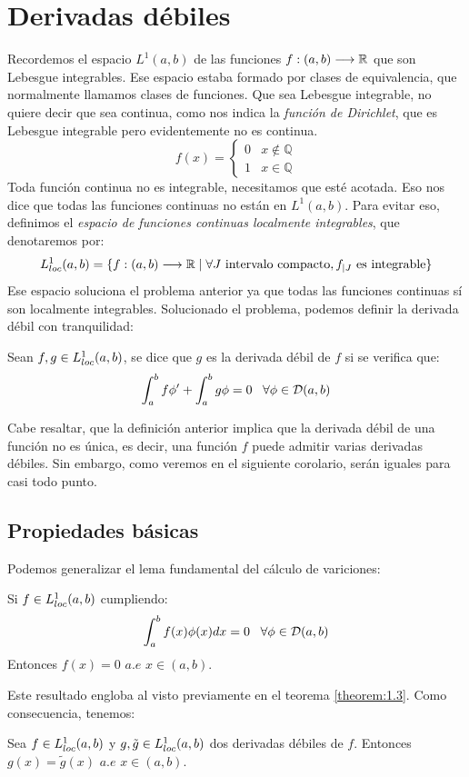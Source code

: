 \chapter{Derivadas débiles}

Recordemos el espacio $L^1(a,b)$ de las funciones $f : (a,b) \longrightarrow \mathbb{R}$ que son Lebesgue integrables. Ese espacio estaba formado por clases de equivalencia, que normalmente llamamos clases de funciones. Que sea Lebesgue integrable, no quiere decir que sea continua, como nos indica la \textit{función de Dirichlet}, que es Lebesgue integrable pero evidentemente no es continua.
\[
f(x)=\left\{
\begin{array}{cc}
0 & x\notin\mathbb{Q} \\
1 & x\in\mathbb{Q}
\end{array}
\right. 
\]
Toda función continua no es integrable, necesitamos que esté acotada. Eso nos dice que todas las funciones continuas no están en $L^1(a,b)$. Para evitar eso, definimos el \textit{espacio de funciones continuas localmente integrables}, que denotaremos por:
\[
L^1_{loc}(a,b)=\{f : (a,b) \longrightarrow \mathbb{R} \;|\; \forall J \text{ intervalo compacto},f_{|J}\text{ es integrable}\}
\]
Ese espacio soluciona el problema anterior ya que todas las funciones continuas sí son localmente integrables. Solucionado el problema, podemos definir la derivada débil con tranquilidad:

\begin{definition}
Sean $f,g\in L^1_{loc}(a,b)$, se dice que $g$ es la derivada débil de $f$ si se verifica que:
\[
\displaystyle\int_{ a }^{ b } f\phi'+\displaystyle\int_{ a }^{ b } g\phi=0 \;\;\; \forall\phi\in\mathcal{D}(a,b)
\]
\end{definition}

Cabe resaltar, que la definición anterior implica que la derivada débil de una función no es única, es decir, una función $f$ puede admitir varias derivadas débiles. Sin embargo, como veremos en el siguiente corolario, serán iguales para casi todo punto.

\section{Propiedades básicas}

Podemos generalizar el lema fundamental del cálculo de variciones:

\begin{theorem}
Si $f\in L^1_{loc}(a,b)$ cumpliendo:
\[
\displaystyle\int_{ a }^{ b } f(x)\phi(x)dx=0 \;\;\;\forall\phi\in\mathcal{D}(a,b)
\]
Entonces $f(x)=0$ $a.e$ $x\in(a,b)$.
\end{theorem}
Este resultado engloba al visto previamente en el teorema \ref{theorem:1.3}. Como consecuencia, tenemos:
\begin{coro}
Sea $f\in L^1_{loc}(a,b)$ y $g,\tilde{g}\in L^1_{loc}(a,b)$ dos derivadas débiles de $f$. Entonces $g(x)=\tilde{g}(x)$ $a.e$ $x\in(a,b)$.
\end{coro}

